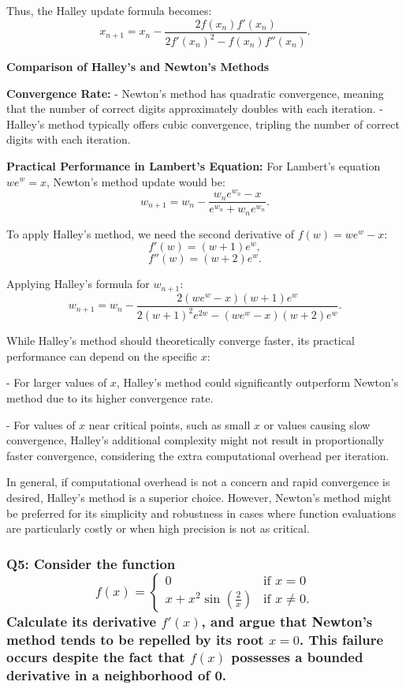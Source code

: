 \documentclass[8pt]{article}
\begin{document}
Thus, the Halley update formula becomes:
\[ x_{n+1} = x_n - \frac{2f(x_n)f'(x_n)}{2f'(x_n)^2 - f(x_n)f''(x_n)}. \]

\textbf{Comparison of Halley's and Newton's Methods}

\textbf{Convergence Rate:}
- Newton's method has quadratic convergence, meaning that the number of correct digits approximately doubles with each iteration.
- Halley's method typically offers cubic convergence, tripling the number of correct digits with each iteration.

\textbf{Practical Performance in Lambert's Equation:}
For Lambert's equation \(we^w = x\), Newton's method update would be:
\[ w_{n+1} = w_n - \frac{w_n e^{w_n} - x}{e^{w_n} + w_n e^{w_n}}. \]

To apply Halley's method, we need the second derivative of \(f(w) = we^w - x\):
\[ f'(w) = (w + 1)e^w, \]
\[ f''(w) = (w + 2)e^w. \]

Applying Halley’s formula for \(w_{n+1}\):
\[ w_{n+1} = w_n - \frac{2(we^w - x)(w+1)e^w}{2(w+1)^2 e^{2w} - (we^w - x)(w+2)e^w}. \]

While Halley's method should theoretically converge faster, its practical performance can depend on the specific \(x\):

- For larger values of \(x\), Halley's method could significantly outperform Newton's method due to its higher convergence rate.

- For values of \(x\) near critical points, such as small \(x\) or values causing slow convergence, Halley’s additional complexity might not result in proportionally faster convergence, considering the extra computational overhead per iteration.

In general, if computational overhead is not a concern and rapid convergence is desired, Halley's method is a superior choice. However, Newton's method might be preferred for its simplicity and robustness in cases where function evaluations are particularly costly or when high precision is not as critical.

\subsubsection*{Q5: Consider the function
\[ f(x) = \begin{cases} 
0 & \text{if } x = 0 \\
x + x^2 \sin\left(\frac{2}{x}\right) & \text{if } x \neq 0.
\end{cases} \]
Calculate its derivative \(f'(x)\), and argue that Newton’s method tends to be repelled by its root \(x = 0\). This failure occurs despite the fact that \(f(x)\) possesses a bounded derivative in a neighborhood of 0.}
\end{document}
